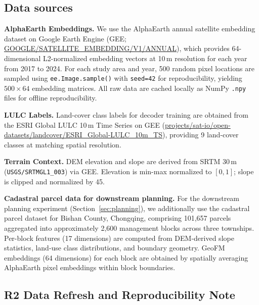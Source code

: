 \documentclass{article}
\begin{document}
\subsection{Data sources}

\textbf{AlphaEarth Embeddings.} We use the AlphaEarth annual satellite embedding dataset on Google Earth Engine (GEE; \url{GOOGLE/SATELLITE_EMBEDDING/V1/ANNUAL}), which provides 64-dimensional L2-normalized embedding vectors at 10\,m resolution for each year from 2017 to 2024. For each study area and year, 500 random pixel locations are sampled using \texttt{ee.Image.sample()} with \texttt{seed=42} for reproducibility, yielding $500\times64$ embedding matrices. All raw data are cached locally as NumPy \texttt{.npy} files for offline reproducibility.

\textbf{LULC Labels.} Land-cover class labels for decoder training are obtained from the ESRI Global LULC 10\,m Time Series on GEE (\url{projects/sat-io/open-datasets/landcover/ESRI_Global-LULC_10m_TS}), providing 9 land-cover classes at matching spatial resolution.

\textbf{Terrain Context.} DEM elevation and slope are derived from SRTM 30\,m (\texttt{USGS/SRTMGL1\_003}) via GEE. Elevation is min-max normalized to $[0,1]$; slope is clipped and normalized by 45\textdegree.

\textbf{Cadastral parcel data for downstream planning.} For the downstream planning experiment (Section~\ref{sec:planning}), we additionally use the cadastral parcel dataset for Bishan County, Chongqing, comprising 101{,}657 parcels aggregated into approximately 2{,}600 management blocks across three townships. Per-block features (17 dimensions) are computed from DEM-derived slope statistics, land-use class distributions, and boundary geometry. GeoFM embeddings (64 dimensions) for each block are obtained by spatially averaging AlphaEarth pixel embeddings within block boundaries.

\subsection{R2 Data Refresh and Reproducibility Note}
\label{sec:data_refresh}
\end{document}
